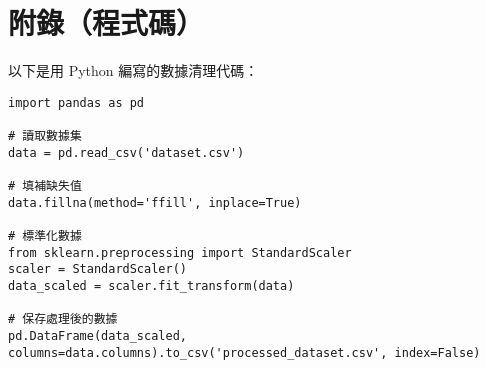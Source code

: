 \appendix
\chapter*{附錄（程式碼）}

以下是用 Python 編寫的數據清理代碼：

\begin{verbatim}
import pandas as pd

# 讀取數據集
data = pd.read_csv('dataset.csv')

# 填補缺失值
data.fillna(method='ffill', inplace=True)

# 標準化數據
from sklearn.preprocessing import StandardScaler
scaler = StandardScaler()
data_scaled = scaler.fit_transform(data)

# 保存處理後的數據
pd.DataFrame(data_scaled, columns=data.columns).to_csv('processed_dataset.csv', index=False)
\end{verbatim}

